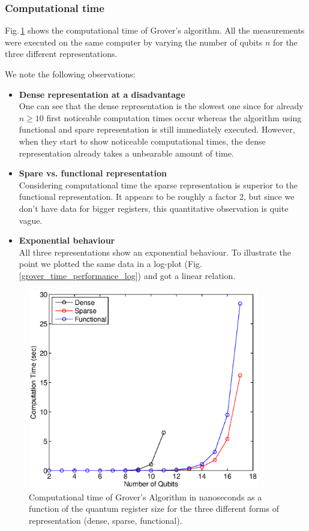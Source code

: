 \documentclass[bibliography=totocnumbered, 10pt]{article}
\theoremstyle{NoticeStyle}
\begin{document}
\subsubsection{Computational time}

Fig.\,\ref{grover_time_performance} shows the computational time of Grover's algorithm. All the measurements were executed on the same computer by varying the number of qubits $n$ for the three different representations.

We note the following observations:
\begin{itemize}
	\item\textbf{Dense representation at a disadvantage}\\
	One can see that the dense representation is the slowest one since for already $n\geq 10$ first noticeable computation times occur whereas the algorithm using functional and spare representation is still immediately executed. However, when they start to show noticeable computational times, the dense representation already takes a unbearable amount of time.
	\item\textbf{Spare vs. functional representation}\\
	Considering computational time the sparse representation is superior to the functional representation. It appears to be roughly a factor 2, but since we don't have data for bigger registers, this quantitative observation is quite vague.
	\item\textbf{Exponential behaviour}\\
	All three representations show an exponential behaviour. To illustrate the point we plotted the same data in a log-plot (Fig.\,\ref{grover_time_performance_log}) and got a linear relation.
\end{itemize}

\begin{figure}[H]
	\centering
	\includegraphics[width=0.9\textwidth]{img/Grover_Time_Performance.eps}
	\caption{Computational time of Grover's Algorithm in nanoseconds as a function of the quantum register size for the three different forms of representation (dense, sparse, functional).}
	\label{grover_time_performance}
\end{figure}
\end{document}
